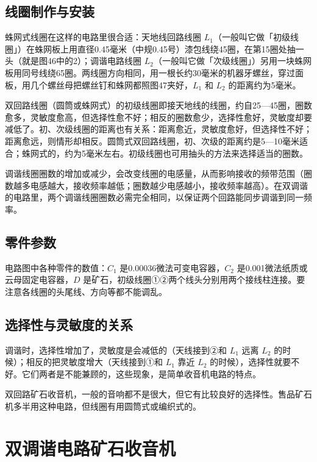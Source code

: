 \documentclass[12pt,UTF8]{ctexbook}
\begin{document}
\subsection{线圈制作与安装}

蛛网式线圈在这样的电路里很合适：天地线回路线圈 $L_1$（一般叫它做「初级线圈」）在蛛网板上用直径0.45毫米（中规0.45号）漆包线绕45圈，在第15圈处抽一头（就是图46中的2）；调谐电路线圈 $L_2$（一般叫它做「次级线圈」）另用一块蛛网板用同号线绕65圈。两线圈方向相同，用一根长约30毫米的机器牙螺丝，穿过面板，用几个螺丝母把螺丝钉和蛛网都照图47夹好，$L_1$ 和 $L_2$ 的距离约为5毫米。

双回路线圈（圆筒或蛛网式）的初级线圈即接天地线的线圈，约自25—45圈，圈数愈多，灵敏度愈高，但选择性愈不好；相反的圈数愈少，选择性愈好，灵敏度却要减低了。初、次级线圈的距离也有关系：距离愈近，灵敏度愈好，但选择性不好；距离愈远，则情形却相反。圆筒式双回路线圈，初、次级的距离约是5—10毫米适合；蛛网式的，约为5毫米左右。初级线圈也可用抽头的方法来选择适当的圈数。

调谐线圈圈数的增加或减少，会改变线圈的电感量，从而影响接收的频带范围（圈数越多电感越大，接收频率越低；圈数越少电感越小，接收频率越高）。在双调谐的电路里，两个调谐线圈圈数必需完全相同，以保证两个回路能同步调谐到同一频率。

\subsection{零件参数}

电路图中各种零件的数值：$C_1$ 是0.00036微法可变电容器，$C_2$ 是0.001微法纸质或云母固定电容器，$D$ 是矿石，初级线圈①②两个线头分别用两个接线柱连接。要注意各线圈的头尾线、方向等都不能调乱。

\subsection{选择性与灵敏度的关系}

调谐时，选择性增加了，灵敏度是会减低的（天线接到②和 $L_1$ 远离 $L_2$ 的时候）；相反的把灵敏度增大（天线接到①和 $L_1$ 靠近 $L_2$ 的时候），选择性就要不好。它们两者是不能兼顾的，这些现象，是简单收音机电路的特点。

双回路矿石收音机，一般的音响都不是很大，但它有比较良好的选择性。售品矿石机多半用这种电路，但线圈有用圆筒式或编织式的。

\section{双调谐电路矿石收音机}
\end{document}
